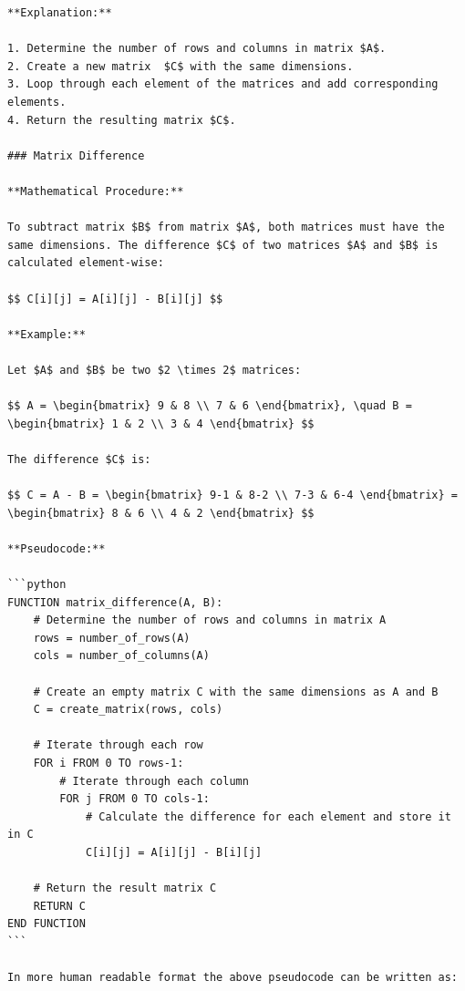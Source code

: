 \documentclass[
  letterpaper,
  DIV=11,
  numbers=noendperiod]{scrreprt}
\theoremstyle{plain}
\theoremstyle{definition}
\theoremstyle{remark}
\begin{document}
\begin{verbatim}
**Explanation:**

1. Determine the number of rows and columns in matrix $A$.
2. Create a new matrix  $C$ with the same dimensions.
3. Loop through each element of the matrices and add corresponding elements.
4. Return the resulting matrix $C$.

### Matrix Difference

**Mathematical Procedure:**

To subtract matrix $B$ from matrix $A$, both matrices must have the same dimensions. The difference $C$ of two matrices $A$ and $B$ is calculated element-wise:

$$ C[i][j] = A[i][j] - B[i][j] $$

**Example:**

Let $A$ and $B$ be two $2 \times 2$ matrices:

$$ A = \begin{bmatrix} 9 & 8 \\ 7 & 6 \end{bmatrix}, \quad B = \begin{bmatrix} 1 & 2 \\ 3 & 4 \end{bmatrix} $$

The difference $C$ is:

$$ C = A - B = \begin{bmatrix} 9-1 & 8-2 \\ 7-3 & 6-4 \end{bmatrix} = \begin{bmatrix} 8 & 6 \\ 4 & 2 \end{bmatrix} $$

**Pseudocode:**

```python
FUNCTION matrix_difference(A, B):
    # Determine the number of rows and columns in matrix A
    rows = number_of_rows(A)
    cols = number_of_columns(A)
    
    # Create an empty matrix C with the same dimensions as A and B
    C = create_matrix(rows, cols)
    
    # Iterate through each row
    FOR i FROM 0 TO rows-1:
        # Iterate through each column
        FOR j FROM 0 TO cols-1:
            # Calculate the difference for each element and store it in C
            C[i][j] = A[i][j] - B[i][j]
    
    # Return the result matrix C
    RETURN C
END FUNCTION
```

In more human readable format the above pseudocode can be written as:


\end{verbatim}
\end{document}

